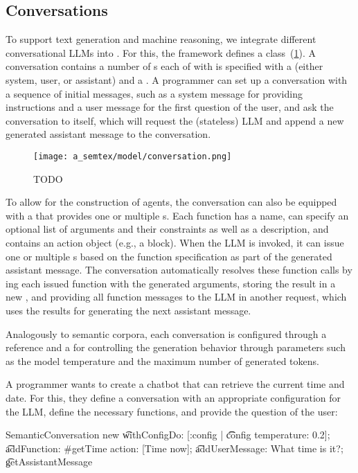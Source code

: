\subsection{Conversations}
\label{sec:semtex/model/conversations}

To support text generation and machine reasoning, we integrate different conversational LLMs into \semtex.
For this, the framework defines a  class~(\cref{fig:semtex/model/conversation}).
A conversation contains a number of s each of with is specified with a  (either system, user, or assistant) and a .
A programmer can set up a conversation with a sequence of initial messages, such as a system message for providing instructions and a user message for the first question of the user, and ask the conversation to  itself, which will request the (stateless) LLM and append a new generated assistant message to the conversation.

\begin{figure}
	\centering
	\texttt{[image: a\_semtex/model/conversation.png]}
	\caption[TODO]{
		TODO
	}
	\label{fig:semtex/model/conversation}
\end{figure}

To allow for the construction of agents, the conversation can also be equipped with a  that provides one or multiple s.
Each function has a name, can specify an optional list of arguments and their constraints as well as a description, and contains an action object (e.g., a block).
When the LLM is invoked, it can issue one or multiple s based on the function specification as part of the generated assistant message.
The conversation automatically resolves these function calls by ing each issued function with the generated arguments, storing the result in a new , and providing all function messages to the LLM in another request, which uses the results for generating the next assistant message.

Analogously to semantic corpora, each conversation is configured through a  reference and a  for controlling the generation behavior through parameters such as the model temperature and the maximum number of generated tokens.

\begin{example}
	A programmer wants to create a chatbot that can retrieve the current time and date.
	For this, they define a conversation with an appropriate configuration for the LLM, define the necessary functions, and provide the question of the user:

	\begin{multicode}
		SemanticConversation new \n
		\t	withConfigDo: [:config | \n
		\t	\t	config temperature: 0.2]; \n
		\t	addFunction: \#getTime action: [Time now]; \n
		\t	addUserMessage: \textquotesingle What time is it?\textquotesingle; \n
		\t	getAssistantMessage 
	\end{multicode}
\end{example}

